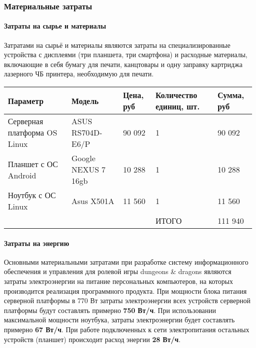 \subsubsection{Материальные затраты}

\paragraph{Затраты на сырье и материалы}
Затратами на сырьё и материалы являются затраты на специализированные устройства с дисплеями (три планшета, три смартфона) и расходные материалы, включающие в себя бумагу для печати, канцтовары и одну заправку картриджа лазерного ЧБ принтера, необходимую для печати.

\begin{longtable}[h]{| p{} | p{} | p{} | p{} | p{} |}
\hline
 Параметр                      &  Модель               &  Цена, руб  &  Количество единиц, шт.  &  Сумма, руб  \\
\hline
 Серверная платформа OS Linux  &  ASUS RS704D-E6/P     &  90 092     &                       1  &  90 092      \\
\hline
 Планшет с ОС Android          &  Google NEXUS 7 16gb  &  10 288     &                       1  &  10 288      \\
\hline
 Ноутбук с ОС Linux            &  Asus X501A           &  11 560     &                       1  &  11 560      \\
\hline
                               &                       &             &                   ИТОГО  &  111 940     \\
\hline
\end{longtable}



\paragraph{Затраты на энергию}
Основными материальными затратами при разработке систему информационного обеспечения и управления для ролевой игры dungeons & dragons являются затраты электроэнергии на питание персональных компьютеров, на которых производится реализация программного продукта. При мощности блока питания серверной платформы в 770 Вт затраты электроэнергии всех устройств серверной платформы будут составлять примерно \textbf{750 Вт/ч}. При использовании максимальной мощности ноутбука, затраты электроэнергии будет составлять примерно \textbf{67 Вт/ч}. При работе подключенных к сети электропитания остальных устройств (планшет) происходит расход энергии \textbf{28 Вт/ч}.

